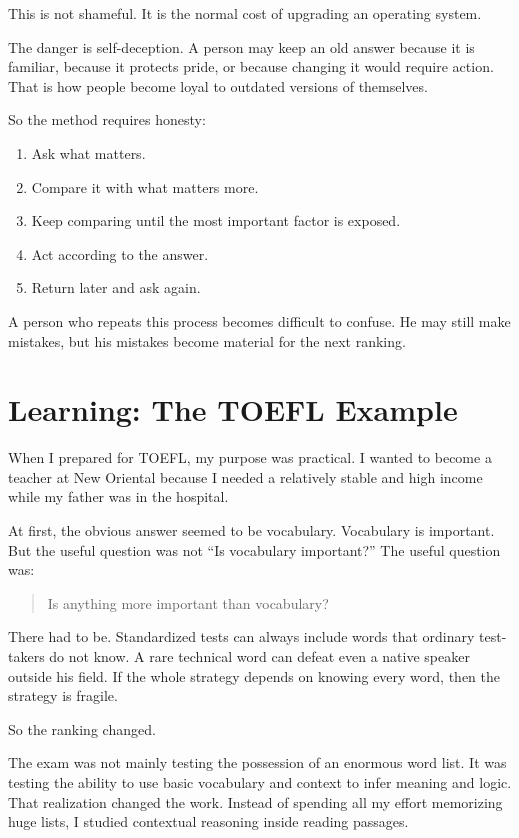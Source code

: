 This is not shameful. It is the normal cost of upgrading an operating system.

The danger is self-deception. A person may keep an old answer because it is familiar, because it protects pride, or because changing it would require action. That is how people become loyal to outdated versions of themselves.

So the method requires honesty:

\begin{enumerate}
\item Ask what matters.
\item Compare it with what matters more.
\item Keep comparing until the most important factor is exposed.
\item Act according to the answer.
\item Return later and ask again.
\end{enumerate}

A person who repeats this process becomes difficult to confuse. He may still make mistakes, but his mistakes become material for the next ranking.

\section*{Learning: The TOEFL Example}

When I prepared for TOEFL, my purpose was practical. I wanted to become a teacher at New Oriental because I needed a relatively stable and high income while my father was in the hospital.

At first, the obvious answer seemed to be vocabulary. Vocabulary is important. But the useful question was not ``Is vocabulary important?'' The useful question was:

\begin{quote}
Is anything more important than vocabulary?
\end{quote}

There had to be. Standardized tests can always include words that ordinary test-takers do not know. A rare technical word can defeat even a native speaker outside his field. If the whole strategy depends on knowing every word, then the strategy is fragile.

So the ranking changed.

The exam was not mainly testing the possession of an enormous word list. It was testing the ability to use basic vocabulary and context to infer meaning and logic. That realization changed the work. Instead of spending all my effort memorizing huge lists, I studied contextual reasoning inside reading passages.

